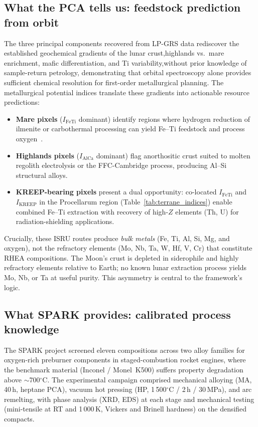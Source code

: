 \documentclass[11pt,a4paper]{article}
\begin{document}
\subsection{What the PCA tells us: feedstock prediction from orbit}

The three principal components recovered from LP-GRS data rediscover the established geochemical gradients of the lunar crust,highlands vs.\ mare enrichment, mafic differentiation, and Ti variability,without prior knowledge of sample-return petrology, demonstrating that orbital spectroscopy alone provides sufficient chemical resolution for first-order metallurgical planning. The metallurgical potential indices translate these gradients into actionable resource predictions:

\begin{itemize}[leftmargin=1.4em]
  \item \textbf{Mare pixels} ($I_\text{FeTi}$ dominant) identify regions where hydrogen reduction of ilmenite or carbothermal processing can yield Fe--Ti feedstock and process oxygen~\cite{Sanders2013,Anand2012}.
  \item \textbf{Highlands pixels} ($I_\text{AlCa}$ dominant) flag anorthositic crust suited to molten regolith electrolysis or the FFC-Cambridge process, producing Al--Si structural alloys.
  \item \textbf{KREEP-bearing pixels} present a dual opportunity: co-located $I_\text{FeTi}$ and $I_\text{KREEP}$ in the Procellarum region (Table~\ref{tab:terrane_indices}) enable combined Fe--Ti extraction with recovery of high-$Z$ elements (Th, U) for radiation-shielding applications.
\end{itemize}

Crucially, these ISRU routes produce \emph{bulk metals} (Fe, Ti, Al, Si, Mg, and oxygen), not the refractory elements (Mo, Nb, Ta, W, Hf, V, Cr) that constitute RHEA compositions. The Moon's crust is depleted in siderophile and highly refractory elements relative to Earth; no known lunar extraction process yields Mo, Nb, or Ta at useful purity. This asymmetry is central to the framework's logic.

\subsection{What SPARK provides: calibrated process knowledge}

The SPARK project screened eleven compositions across two alloy families for oxygen-rich preburner components in staged-combustion rocket engines, where the benchmark material (Inconel / Monel~K500) suffers property degradation above $\sim$700$^\circ$C. The experimental campaign comprised mechanical alloying (MA, 40\,h, heptane PCA), vacuum hot pressing (HP, 1\,500$^\circ$C / 2\,h / 30\,MPa), and arc remelting, with phase analysis (XRD, EDS) at each stage and mechanical testing (mini-tensile at RT and 1\,000\,K, Vickers and Brinell hardness) on the densified compacts.
\end{document}
